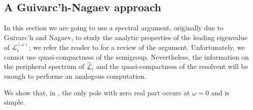 \documentclass[11pt,letterpaper]{amsart}
\newcommand \cL {{\mathcal L}}
\theoremstyle{definition}
\begin{document}




\subsection{A Guivarc'h-Nagaev approach} In this section we are going to use a spectral argument, originally due to Guivarc'h and Nagaev, to study the analytic properties of the leading eigenvalue of $\cL^{(\omega)}_t$; we refer the reader to  \cite{Gou} for a review of the argument. %
Unfortunately, 
we cannot use quasi-compactness of the semigroup. Nevertheless, the information on the peripheral spectrum of $\hat \cL_t$ and the quasi-compactness of the resolvent will be enough to performe an analogous computation.
  

We show that, in , the only pole with zero real part occurs at $\omega =0$ and is simple.
\end{document}
